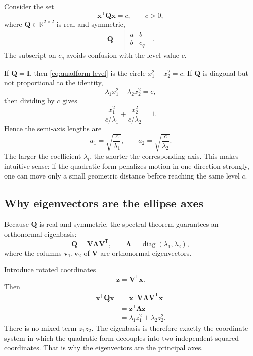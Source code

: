 \documentclass[11pt,a4paper]{article}
\newcommand{\T}{\mathsf{T}}
\newcommand{\R}{\mathbb{R}}
\newcommand{\vct}[1]{\bm{#1}}
\newcommand{\mat}[1]{\bm{#1}}
\begin{document}
Consider the set
\begin{equation}
  \vct x^\T \mat Q\vct x = c,
  \qquad c>0,
  \label{eq:quadform-level}
\end{equation}
where $\mat Q\in\R^{2\times2}$ is real and symmetric,
\begin{equation}
  \mat Q =
  \begin{bmatrix}
    a & b\\
    b & c_q
  \end{bmatrix}.
\end{equation}
The subscript on $c_q$ avoids confusion with the level value $c$.

If $\mat Q=\mat I$, then \eqref{eq:quadform-level} is the circle $x_1^2+x_2^2=c$. If $\mat Q$ is diagonal but not proportional to the identity,
\begin{equation}
  \lambda_1 x_1^2 + \lambda_2 x_2^2 = c,
\end{equation}
then dividing by $c$ gives
\begin{equation}
  \frac{x_1^2}{c/\lambda_1} + \frac{x_2^2}{c/\lambda_2}=1.
\end{equation}
Hence the semi-axis lengths are
\begin{equation}
  a_1=\sqrt{\frac{c}{\lambda_1}},
  \qquad
  a_2=\sqrt{\frac{c}{\lambda_2}}.
  \label{eq:axis-length-basic}
\end{equation}
The larger the coefficient $\lambda_i$, the shorter the corresponding axis. This makes intuitive sense: if the quadratic form penalizes motion in one direction strongly, one can move only a small geometric distance before reaching the same level $c$.

\subsection{Why eigenvectors are the ellipse axes}

Because $\mat Q$ is real and symmetric, the spectral theorem guarantees an orthonormal eigenbasis:
\begin{equation}
  \mat Q = \mat V\mat\Lambda\mat V^\T,
  \qquad
  \mat\Lambda=\operatorname{diag}(\lambda_1,\lambda_2),
\end{equation}
where the columns $\vct v_1,\vct v_2$ of $\mat V$ are orthonormal eigenvectors.

Introduce rotated coordinates
\begin{equation}
  \vct z = \mat V^\T\vct x.
\end{equation}
Then
\begin{align}
  \vct x^\T\mat Q\vct x
  &= \vct x^\T\mat V\mat\Lambda\mat V^\T\vct x\\
  &= \vct z^\T\mat\Lambda\vct z\\
  &= \lambda_1 z_1^2+\lambda_2 z_2^2.
\end{align}
There is no mixed term $z_1z_2$. The eigenbasis is therefore exactly the coordinate system in which the quadratic form decouples into two independent squared coordinates. That is why the eigenvectors are the principal axes.
\end{document}
